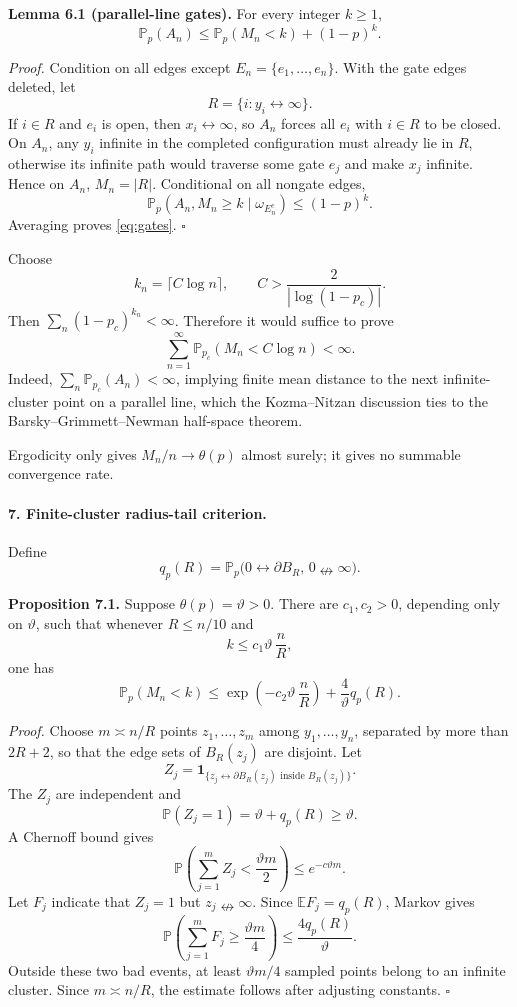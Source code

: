 \documentclass[11pt]{article}
\newcommand{\one}{\mathbf 1}
\begin{document}
\textbf{Lemma 6.1 (parallel-line gates).}
For every integer \(k\ge1\),
\[
\boxed{
\mathbb P_p(A_n)
\le
\mathbb P_p(M_n<k)+(1-p)^k.
}
\tag{6.1}\label{eq:gates}
\]

\emph{Proof.}
Condition on all edges except \(E_n=\{e_1,\ldots,e_n\}\). With the gate edges deleted, let
\[
R=\{i:y_i\leftrightarrow\infty\}.
\]
If \(i\in R\) and \(e_i\) is open, then \(x_i\leftrightarrow\infty\), so \(A_n\) forces all \(e_i\) with \(i\in R\) to be closed. On \(A_n\), any \(y_i\) infinite in the completed configuration must already lie in \(R\), otherwise its infinite path would traverse some gate \(e_j\) and make \(x_j\) infinite. Hence on \(A_n\), \(M_n=|R|\). Conditional on all nongate edges,
\[
\mathbb P_p(A_n,M_n\ge k\mid\omega_{E_n^c})\le(1-p)^k.
\]
Averaging proves \eqref{eq:gates}. \hfill\(\square\)

Choose
\[
k_n=\lceil C\log n\rceil,
\qquad
C>\frac{2}{|\log(1-p_c)|}.
\]
Then \(\sum_n(1-p_c)^{k_n}<\infty\). Therefore it would suffice to prove
\[
\boxed{
\sum_{n=1}^\infty
\mathbb P_{p_c}(M_n<C\log n)<\infty.
}
\tag{6.2}\label{eq:linecriterion}
\]
Indeed, \(\sum_n\mathbb P_{p_c}(A_n)<\infty\), implying finite mean distance to the next infinite-cluster point on a parallel line, which the Kozma--Nitzan discussion ties to the Barsky--Grimmett--Newman half-space theorem.

Ergodicity only gives \(M_n/n\to\theta(p)\) almost surely; it gives no summable convergence rate.

\paragraph{7. Finite-cluster radius-tail criterion.}
Define
\[
q_p(R)=
\mathbb P_p\bigl(
0\leftrightarrow\partial B_R,\,
0\nleftrightarrow\infty
\bigr).
\tag{7.1}\label{eq:truncatedarm}
\]

\textbf{Proposition 7.1.}
Suppose \(\theta(p)=\vartheta>0\). There are \(c_1,c_2>0\), depending only on \(\vartheta\), such that whenever \(R\le n/10\) and
\[
k\le c_1\vartheta\,\frac nR,
\]
one has
\[
\boxed{
\mathbb P_p(M_n<k)
\le
\exp\left(-c_2\vartheta\,\frac nR\right)
+\frac4{\vartheta}q_p(R).
}
\tag{7.2}\label{eq:radiustail}
\]

\emph{Proof.}
Choose \(m\asymp n/R\) points \(z_1,\ldots,z_m\) among \(y_1,\ldots,y_n\), separated by more than \(2R+2\), so that the edge sets of \(B_R(z_j)\) are disjoint. Let
\[
Z_j=\one_{\{z_j\leftrightarrow\partial B_R(z_j)\text{ inside }B_R(z_j)\}}.
\]
The \(Z_j\) are independent and
\[
\mathbb P(Z_j=1)=\vartheta+q_p(R)\ge\vartheta.
\]
A Chernoff bound gives
\[
\mathbb P\left(\sum_{j=1}^mZ_j<\frac{\vartheta m}{2}\right)
\le e^{-c\vartheta m}.
\]
Let \(F_j\) indicate that \(Z_j=1\) but \(z_j\nleftrightarrow\infty\). Since \(\mathbb EF_j=q_p(R)\), Markov gives
\[
\mathbb P\left(\sum_{j=1}^mF_j\ge\frac{\vartheta m}{4}\right)
\le\frac{4q_p(R)}{\vartheta}.
\]
Outside these two bad events, at least \(\vartheta m/4\) sampled points belong to an infinite cluster. Since \(m\asymp n/R\), the estimate follows after adjusting constants. \hfill\(\square\)
\end{document}
